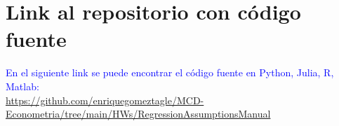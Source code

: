 \documentclass[10pt]{article}
\begin{document}
\section{Link al repositorio con código fuente}
    \textcolor{blue}{
    En el siguiente link se puede encontrar el código fuente en Python, Julia, R, Matlab:\\
    \url{https://github.com/enriquegomeztagle/MCD-Econometria/tree/main/HWs/RegressionAssumptionsManual}
    }
\end{document}
